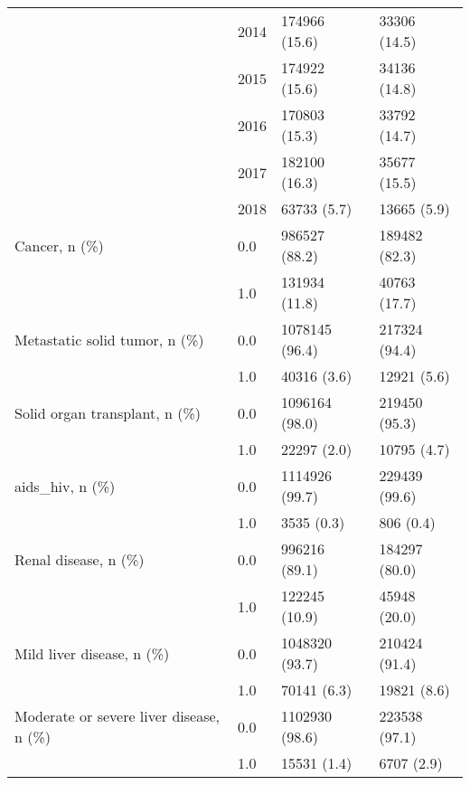 \begin{tabular}{llll}
                                       & 2014 &                         174966 (15.6) &      33306 (14.5) \\
                                       & 2015 &                         174922 (15.6) &      34136 (14.8) \\
                                       & 2016 &                         170803 (15.3) &      33792 (14.7) \\
                                       & 2017 &                         182100 (16.3) &      35677 (15.5) \\
                                       & 2018 &                           63733 (5.7) &       13665 (5.9) \\
Cancer, n (\%) & 0.0 &                         986527 (88.2) &     189482 (82.3) \\
                                       & 1.0 &                         131934 (11.8) &      40763 (17.7) \\
Metastatic solid tumor, n (\%) & 0.0 &                        1078145 (96.4) &     217324 (94.4) \\
                                       & 1.0 &                           40316 (3.6) &       12921 (5.6) \\
Solid organ transplant, n (\%) & 0.0 &                        1096164 (98.0) &     219450 (95.3) \\
                                       & 1.0 &                           22297 (2.0) &       10795 (4.7) \\
aids\_hiv, n (\%) & 0.0 &                        1114926 (99.7) &     229439 (99.6) \\
                                       & 1.0 &                            3535 (0.3) &         806 (0.4) \\
Renal disease, n (\%) & 0.0 &                         996216 (89.1) &     184297 (80.0) \\
                                       & 1.0 &                         122245 (10.9) &      45948 (20.0) \\
Mild liver disease, n (\%) & 0.0 &                        1048320 (93.7) &     210424 (91.4) \\
                                       & 1.0 &                           70141 (6.3) &       19821 (8.6) \\
Moderate or severe liver disease, n (\%) & 0.0 &                        1102930 (98.6) &     223538 (97.1) \\
                                       & 1.0 &                           15531 (1.4) &        6707 (2.9) \\

\end{tabular}
